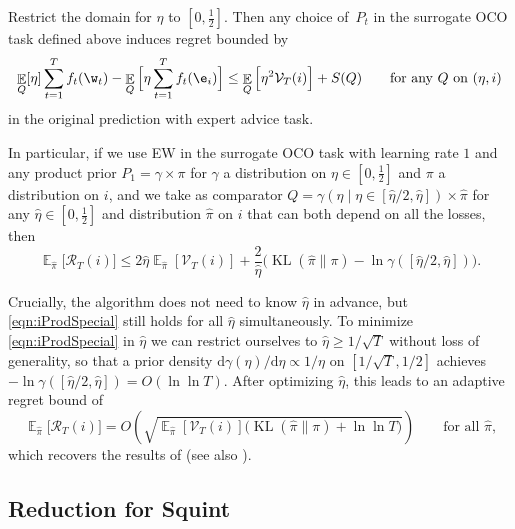 \documentclass{colt2018} %
\DeclareMathOperator*{\E}{\mathbb{E}}
\DeclareMathOperator{\kl}{KL}
\newcommand{\half}{\frac{1}{2}}
\newcommand{\sregret}{S}                        %
\newcommand{\etaopt}{\hat{\eta}}                %
\newcommand{\der}{\mathrm{d}}                   %
\newcommand{\postpi}{\hat{\pi}}                 %
\newcommand{\regret}{\mathcal{R}}
\newcommand{\V}{\mathcal{V}}                    %
\begin{document}
\begin{theorem}\label{thm:iProd}
  Restrict the domain for $\eta$ to $[0,\half]$. Then any choice
  of~$P_t$ in the surrogate OCO task defined above induces regret
  bounded by
  \begin{equation}\label{eqn:iProdReduction}
    \E_Q[\eta] \sum_{t=1}^T f_t(\w_t) - \E_Q\Big[\eta \sum_{t=1}^T
    f_t(\e_i)\Big]
      \leq \E_Q\Big[\eta^2 \V_T(i)\Big] + \sregret(Q)
    \qquad \text{for any $Q$ on $(\eta,i)$}
  \end{equation}
  in the original prediction with expert advice task.

  In particular, if we use EW in the surrogate OCO task with learning
  rate $1$ and any product prior $P_1 = \gamma \times \pi$ for $\gamma$
  a distribution on $\eta \in [0,\half]$ and $\pi$ a distribution on
  $i$, and we take as comparator $Q = \gamma(\eta \mid \eta \in
  [\etaopt/2,\etaopt]) \times \postpi$ for any $\etaopt \in [0,\half]$
  and distribution $\postpi$ on $i$ that can both depend on all the
  losses, then
  \begin{equation}\label{eqn:iProdSpecial}
    \E_{\postpi}\big[\regret_T(i)\big]
      \leq 2 \etaopt
      \E_{\postpi}[\V_T(i)] + \frac{2}{\etaopt}
      \Big(\kl(\postpi\|\pi) - \ln \gamma([\etaopt/2,\etaopt])\Big).
  \end{equation}
\end{theorem}
% 
Crucially, the algorithm does not need to know $\etaopt$ in advance, but
\eqref{eqn:iProdSpecial} still holds for all $\etaopt$ simultaneously.
To minimize \eqref{eqn:iProdSpecial} in $\etaopt$ we can restrict
ourselves to $\etaopt \geq 1/\sqrt{T}$ without loss of generality, so
that a prior density $\der \gamma(\eta)/\der \eta \propto 1/\eta$ on
$[1/\sqrt{T},1/2]$ achieves $- \ln \gamma([\etaopt/2,\etaopt]) = O(\ln
\ln T)$. After optimizing $\etaopt$, this leads to an adaptive regret
bound of
% 
\begin{equation}\label{eqn:iProdBigOh}
  \E_{\postpi}\big[\regret_T(i)\big]
    = O\left(\sqrt{\E_{\postpi}[\V_T(i)]\Big(\kl(\postpi\|\pi) + \ln \ln T\Big)}\right)
  \qquad \text{for all $\postpi$,} 
\end{equation}
% 
which recovers the results of \citet{KoolenVanErven2015} (see also
\citep{koolen2015blog}).

\subsection{Reduction for Squint}
\end{document}
